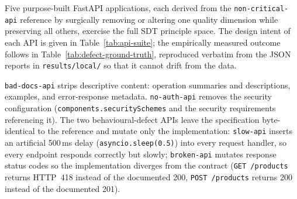 Five purpose-built FastAPI applications, each derived from the \texttt{non-critical-api} reference by surgically removing or altering one quality dimension while preserving all others, exercise the full SDT principle space. The design intent of each API is given in Table~\ref{tab:api-suite}; the empirically measured outcome follows in Table~\ref{tab:defect-ground-truth}, reproduced verbatim from the JSON reports in \texttt{results/local/} so that it cannot drift from the data.

\begin{table}[htbp]
\centering
\caption{Evaluation API suite: each API targets a distinct defect class.}
\label{tab:api-suite}
\small
{}
\end{table}

\texttt{bad-docs-api} strips descriptive content: operation summaries and descriptions, examples, and error-response metadata. \texttt{no-auth-api} removes the security configuration (\texttt{components.\allowbreak securitySchemes} and the security requirements referencing it). The two behavioural-defect APIs leave the specification byte-identical to the reference and mutate only the implementation: \texttt{slow-api} inserts an artificial 500\,ms delay (\texttt{asyncio.sleep(0.5)}) into every request handler, so every endpoint responds correctly but slowly; \texttt{broken-api} mutates response status codes so the implementation diverges from the contract (\texttt{GET /products} returns HTTP~418 instead of the documented 200, \texttt{POST /products} returns 200 instead of the documented 201).


